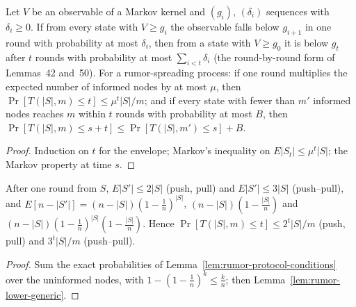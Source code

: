 \begin{lemma}\label{lem:rumor-lower-generic}
\leanok{}
Let $V$ be an observable of a Markov kernel and $(g_i)$, $(\delta_i)$ sequences with
$\delta_i\ge0$. If from every state with $V\ge g_i$ the observable falls below $g_{i+1}$ in one
round with probability at most $\delta_i$, then from a state with $V\ge g_0$ it is below $g_t$
after $t$ rounds with probability at most $\sum_{i<t}\delta_i$ (the round-by-round form of
Lemmas~42 and~50). For a rumor-spreading process: if one round multiplies the expected number of
informed nodes by at most $\mu$, then $\Pr[T(|S|,m)\le t]\le\mu^t|S|/m$; and if every state with
fewer than $m'$ informed nodes reaches $m$ within $t$ rounds with probability at most $B$, then
$\Pr[T(|S|,m)\le s+t]\le\Pr[T(|S|,m')\le s]+B$.
\end{lemma}
\begin{proof}\leanok
Induction on $t$ for the envelope; Markov's inequality on $E|S_t|\le\mu^t|S|$; the Markov
property at time $s$.
\end{proof}

\begin{lemma}\label{lem:rumor-lower-growth}
\leanok{}
After one round from $S$, $E|S'|\le2|S|$ (push, pull) and $E|S'|\le3|S|$ (push--pull), and
$E[n-|S'|]=(n-|S|)(1-\frac1n)^{|S|}$, $(n-|S|)(1-\frac{|S|}n)$ and
$(n-|S|)(1-\frac1n)^{|S|}(1-\frac{|S|}n)$. Hence $\Pr[T(|S|,m)\le t]\le2^t|S|/m$ (push, pull) and
$3^t|S|/m$ (push--pull).
\end{lemma}
\begin{proof}\leanok
Sum the exact probabilities of Lemma~\ref{lem:rumor-protocol-conditions} over the uninformed
nodes, with $1-(1-\frac1n)^k\le\frac kn$; then Lemma~\ref{lem:rumor-lower-generic}.
\end{proof}


